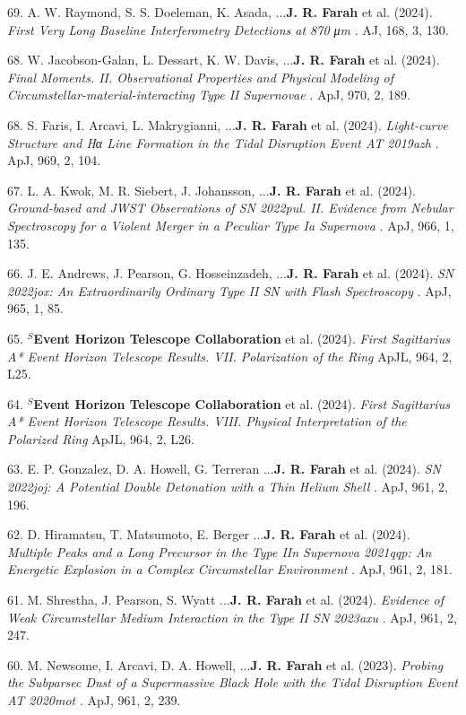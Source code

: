 \documentclass[margin,line]{res}
\begin{document}
\begin{resume}
69. A. W. Raymond, S. S. Doeleman, K. Asada, ...\textbf{J. R. Farah} et al. (2024). \textit{ First Very Long Baseline Interferometry Detections at 870 μm }. AJ, 168, 3, 130.

68. W. Jacobson-Galan, L. Dessart, K. W. Davis, ...\textbf{J. R. Farah} et al. (2024). \textit{  Final Moments. II. Observational Properties and Physical Modeling of Circumstellar-material-interacting Type II Supernovae }. ApJ, 970, 2, 189.

68. S. Faris, I. Arcavi, L. Makrygianni, ...\textbf{J. R. Farah} et al. (2024). \textit{  Light-curve Structure and Hα Line Formation in the Tidal Disruption Event AT 2019azh }. ApJ, 969, 2, 104.

67. L. A. Kwok, M. R. Siebert, J. Johansson, ...\textbf{J. R. Farah} et al. (2024). \textit{ Ground-based and JWST Observations of SN 2022pul. II. Evidence from Nebular Spectroscopy for a Violent Merger in a Peculiar Type Ia Supernova }. ApJ, 966, 1, 135.

66. J. E. Andrews, J. Pearson, G. Hosseinzadeh, ...\textbf{J. R. Farah} et al. (2024). \textit{ SN 2022jox: An Extraordinarily Ordinary Type II SN with Flash Spectroscopy }. ApJ, 965, 1, 85.


65. \textbf{$^S$Event Horizon Telescope Collaboration} et al. (2024). \textit{ First Sagittarius A* Event Horizon Telescope Results. VII. Polarization of the Ring } ApJL, 964, 2, L25.

64. \textbf{$^S$Event Horizon Telescope Collaboration} et al. (2024). \textit{ First Sagittarius A* Event Horizon Telescope Results. VIII. Physical Interpretation of the Polarized Ring } ApJL, 964, 2, L26.

63. E. P. Gonzalez, D. A. Howell, G. Terreran ...\textbf{J. R. Farah} et al. (2024). \textit{ SN 2022joj: A Potential Double Detonation with a Thin Helium Shell  }. ApJ, 961, 2, 196.

62. D. Hiramatsu, T. Matsumoto, E. Berger ...\textbf{J. R. Farah} et al. (2024). \textit{ Multiple Peaks and a Long Precursor in the Type IIn Supernova 2021qqp: An Energetic Explosion in a Complex Circumstellar Environment   }. ApJ, 961, 2, 181.

61. M. Shrestha, J. Pearson, S. Wyatt ...\textbf{J. R. Farah} et al. (2024). \textit{ Evidence of Weak Circumstellar Medium Interaction in the Type II SN 2023axu  }. ApJ, 961, 2, 247.

60. M. Newsome, I. Arcavi, D. A. Howell, ...\textbf{J. R. Farah} et al. (2023). \textit{ Probing the Subparsec Dust of a Supermassive Black Hole with the Tidal Disruption Event AT 2020mot }. ApJ, 961, 2, 239.


\end{resume}
\end{document}
